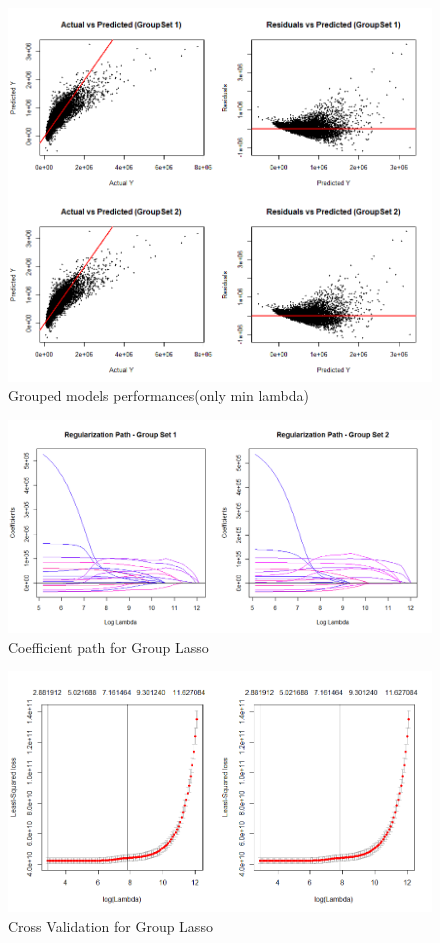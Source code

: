 \documentclass[a4paper, 11pt]{article}
\begin{document}
\begin{figure}[H]
\includegraphics[scale=0.65]{gglassoperf}
\centering
\caption{Grouped models performances(only min lambda)}
\label{fig:gglassoperf}
\end{figure}

\begin{figure}[H]
\includegraphics[scale=0.55]{gglassocoefpath}
\centering
\caption{Coefficient path for Group Lasso}
\label{fig:gglassocoefpath}
\end{figure}

\begin{figure}[H]
\includegraphics[scale=0.55]{gglassocv}
\centering
\caption{Cross Validation for Group Lasso}
\label{fig:gglassocv}
\end{figure}
\end{document}
